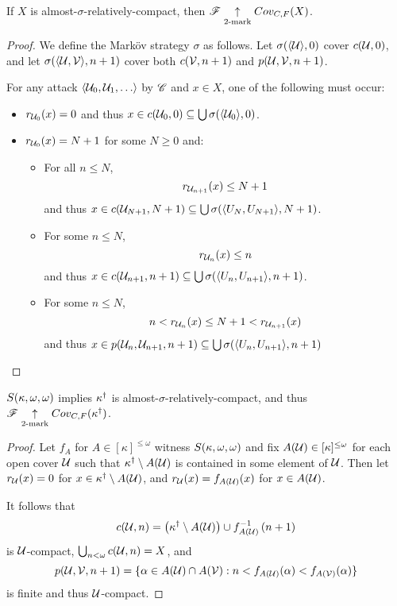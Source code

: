 \begin{thm}
  If $X$ is almost-$\sigma$-relatively-compact, then
  $\mathscr{F}\underset{2\text{-mark}}{\uparrow}Cov_{C,F}(X)$.
\end{thm}

\begin{proof}
  We define the Mark\"ov strategy $\sigma$ as follows.
  Let $\sigma(\langle\mathcal{U}\rangle,0)$ cover $c(\mathcal{U},0)$, and let
  $\sigma(\langle\mathcal{U},\mathcal{V}\rangle,n+1)$ cover both $c(\mathcal{V},n+1)$ and
  $p(\mathcal{U}, \mathcal{V},n+1)$.

  For any attack $\<\mc{U}_0,\mc{U}_1,\dots\>$ by $\mathscr{C}$ and $x\in X$,
  one of the following must occur:

  \begin{itemize}
    \item
      $r_{\mathcal{U}_0}(x)=0$ and thus
      $x\in c(\mathcal{U}_0,0)\subseteq \bigcup \sigma(\langle\mathcal{U}_0\rangle,0)$.

    \item
      $r_{\mathcal{U}_0}(x)=N+1$ for some $N\geq 0$ and:
      \begin{itemize}
        \item
          For all $n\leq N$,
          \[
            r_{\mathcal{U}_{n+1}}(x)\leq N+1
          \]
          and thus
          $x\in c(\mathcal{U}_{N+1},N+1) \subseteq
            \bigcup \sigma(\langle U_N,U_{N+1}\rangle,N+1)$.
        \item
          For some $n \leq N$,
          \[ r_{\mathcal{U}_n}(x)\leq n \]
          and thus
          $x\in c(\mathcal{U}_{n+1},n+1) \subseteq
            \bigcup \sigma(\langle U_n,U_{n+1}\rangle,n+1)$.
        \item
          For some $n \leq N$,
          \[
            n < r_{\mathcal{U}_n}(x)\leq N+1 < r_{\mathcal{U}_{n+1}}(x)
          \]
         and thus
         $x\in p(\mathcal{U}_n,\mathcal{U}_{n+1},n+1) \subseteq
          \bigcup \sigma(\langle U_n,U_{n+1}\rangle,n+1)$
       \end{itemize}
  \end{itemize}
\end{proof}

\begin{thm}
  $S(\kappa,\omega,\omega)$ implies $\kappa^\dagger$ is
  almost-$\sigma$-relatively-compact, and thus
  $\mathscr{F}\underset{2\text{-mark}}{\uparrow}Cov_{C,F}(\kappa^\dagger)$.
\end{thm}

\begin{proof}
  Let $f_A$ for $A\in[\kappa]^{\leq\omega}$ witness $S(\kappa,\omega,\omega)$ and fix
  $A(\mathcal{U})\in[\kappa]^{\leq\omega}$ for each open cover $\mathcal{U}$ such that
  $\kappa^\dagger\setminus A(\mathcal{U})$ is contained in some element of
  $\mathcal{U}$.
  Then let $r_{\mathcal{U}}(x)=0$ for $x\in\kappa^\dagger\setminus A(\mathcal{U})$,
  and $r_{\mathcal{U}}(x)=f_{A(\mathcal{U})}(x)$ for $x\in A(\mathcal{U})$.

  It follows that
    \[
      c(\mathcal{U},n)
        =
      \left(\kappa^\dagger\setminus A(\mathcal{U})\right)
        \cup
      f_{A(\mathcal{U})}^{-1}\left(n+1\right)
    \]
  is $\mathcal{U}$-compact, $\bigcup_{n<\omega}c(\mathcal{U},n)=X$, and
    \[
      p(\mathcal{U},\mathcal{V},n+1)
        =
      \{
        \alpha\in A(\mathcal{U})\cap A(\mathcal{V})
          :
        n < f_{A(\mathcal{U})}(\alpha) < f_{A(\mathcal{V})}(\alpha)
      \}
    \]
  is finite and thus $\mathcal{U}$-compact.
\end{proof}

